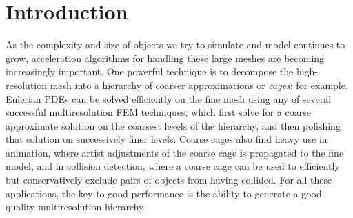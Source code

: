 \section{Introduction}
\label{sec:introduction}

As the complexity and size of objects we try to simulate and model continues to
grow, acceleration algorithms for handling these large meshes are becoming
increasingly important. One powerful technique is to decompose the
high-resolution mesh into a hierarchy of coarser approximations or
\emph{cages}: for example, Eulerian PDEs can be solved efficiently on the fine
mesh using any of several successful multiresolution FEM techniques, which
first solve for a coarse approximate solution on the coarsest levels of the
hierarchy, and then polishing that solution on successively finer levels.
Coarse cages also find heavy use in animation, where artist adjustments of the
coarse cage is propagated to the fine model, and in collision detection, where
a coarse cage can be used to efficiently but conservatively exclude pairs of
objects from having collided. For all these applications, the key to good
performance is the ability to generate a good-quality multiresolution
hierarchy.


